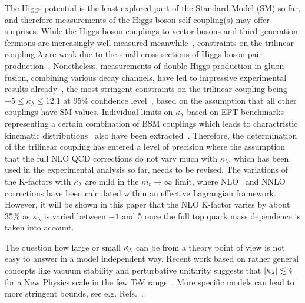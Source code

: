 The Higgs potential is the least explored part of the Standard Model (SM) so far, and therefore measurements of the Higgs boson self-coupling(s) may offer surprises.
While the Higgs boson couplings to vector bosons and third generation fermions are increasingly well measured meanwhile~\cite{Khachatryan:2016vau,Aaboud:2017vzb,ATLAS:2018doi,Sirunyan:2018koj,Sirunyan:2018sgc}, constraints on the trilinear coupling $\lambda$ are weak due to the small cross sections of Higgs boson pair production~\cite{Baglio:2012np,Frederix:2014hta}.  
Nonetheless, measurements of double Higgs production in gluon fusion, combining various decay channels,  have led to impressive experimental results already~\cite{Sirunyan:2018two,Sirunyan:2018iwt,ATLAS-CONF-2018-043,Aaboud:2018ftw}, 
the most stringent constraints on the trilinear coupling being $-5\leq \kappa_\lambda\leq 12.1$
 at 95\% confidence level~\cite{ATLAS-CONF-2018-043}, based on the assumption that all other couplings have SM values.
Individual limits on $\kappa_\lambda$ based on EFT benchmarks representing a certain combination of BSM couplings which leads to charactristic kinematic distributions~\cite{Carvalho:2015ttv,Carvalho:2016rys,Buchalla:2018yce} also have been extracted~\cite{Sirunyan:2018two,Sirunyan:2018iwt}.
Therefore, the determination of the trilinear coupling has entered a level of precision where the assumption that the full NLO QCD corrections do not vary much with $\kappa_\lambda$, which has been used in the experimental analysis so far, needs to be revised.
The variations of the K-factors with $\kappa_\lambda$ are mild in the $m_t\to \infty$ limit, where NLO~\cite{Grober:2015cwa,Grober:2017gut} and NNLO~\cite{deFlorian:2017qfk} corrections have been calculated within an effective Lagrangian framework.
However, it will be shown in this paper that the NLO K-factor varies by about 35\% as $\kappa_\lambda$ is varied between $-1$ and 5 once the full top quark mass dependence is taken into account. 

The question how large or small $\kappa_{\lambda}$ can be from a theory point of view is not easy to answer in a model independent way. 
Recent work based on rather general concepts like vacuum stability and perturbative unitarity suggests that $|\kappa_{\lambda}|\lesssim 4$ for a New Physics scale in the few TeV range~\cite{Falkowski:2019tft,Chang:2019vez,DiLuzio:2017tfn,DiVita:2017eyz}.
More specific models can lead to more stringent bounds, see e.g. Refs.~\cite{Braathen:2019pxr,Basler:2018dac,Babu:2018uik,Lewis:2017dme}.

\medskip

